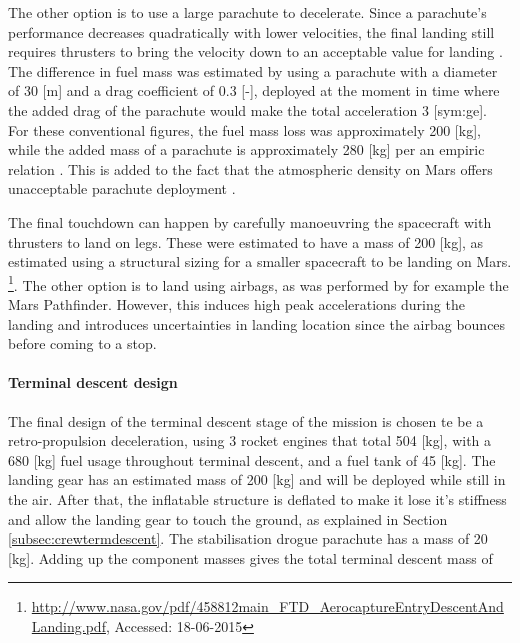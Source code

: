 The other option is to use a large parachute to decelerate. Since a parachute's performance decreases quadratically with lower velocities, the final landing still requires thrusters to bring the velocity down to an acceptable value for landing \cite{Braun2007}. The difference in fuel mass was estimated by using a parachute with a diameter of 30 [m] and a drag coefficient of 0.3 [-], deployed at the moment in time where the added drag of the parachute would make the total acceleration 3 [\gls{sym:ge}]. For these conventional figures, the fuel mass loss was approximately 200 [kg], while the added mass of a parachute is approximately 280 [kg] per an empiric relation \cite{Anderson1969}. This is added to the fact that the atmospheric density on Mars offers unacceptable parachute deployment \cite{Korzun2009}.

The final touchdown can happen by carefully manoeuvring the spacecraft with thrusters to land on legs. These were estimated to have a mass of 200 [kg], as estimated using a structural sizing for a smaller spacecraft to be landing on Mars. \footnote{\url{http://www.nasa.gov/pdf/458812main_FTD_AerocaptureEntryDescentAndLanding.pdf}, Accessed: 18-06-2015}. The other option is to land using airbags, as was performed by for example the Mars Pathfinder. However, this induces high peak accelerations during the landing and introduces uncertainties in landing location since the airbag bounces before coming to a stop.

\paragraph{Terminal descent design}
The final design of the terminal descent stage of the mission is chosen te be a retro-propulsion deceleration, using 3 rocket engines that total 504 [kg], with a 680 [kg] fuel usage throughout terminal descent, and a fuel tank of 45 [kg]. The landing gear has an estimated mass of 200 [kg] and will be deployed while still in the air. After that, the inflatable structure is deflated to make it lose it's stiffness and allow the landing gear to touch the ground, as explained in Section \ref{subsec:crewtermdescent}. The stabilisation drogue parachute has a mass of 20 [kg]. Adding up the component masses gives the total terminal descent mass of 